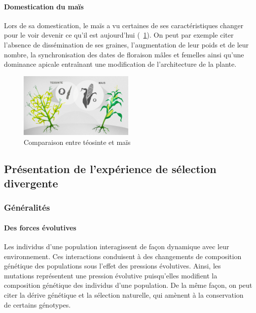 \documentclass[12pt,a4paper]{article}
\begin{document}
						\paragraph{Domestication du maïs} 
							Lors de sa domestication, le maïs a vu certaines de ses caractéristiques changer pour le voir devenir ce qu'il est aujourd'hui (~\ref{Comparaison entre téosinte et maïs}). On peut par exemple citer l'absence de dissémination de ses graines, l'augmentation de leur poids et de leur nombre, la synchronisation des dates de floraison mâles et femelles ainsi qu'une dominance apicale entraînant une modification de l'architecture de la plante.
							\begin{figure}[h]
								\centering
								\includegraphics[width=0.5\textwidth]{comparaison.jpg}
								\caption{Comparaison entre téosinte et maïs}
								\label{Comparaison entre téosinte et maïs}
							\end{figure}
	
						
						
				\subsection{Présentation de l'expérience de sélection divergente}
				
					\subsubsection{Généralités}
						
						\paragraph{Des forces évolutives}
							Les individus d'une population interagissent de façon dynamique avec leur environnement. Ces interactions conduisent à des changements de composition génétique des populations sous l'effet des pressions évolutives. Ainsi, les mutations représentent une pression évolutive puisqu'elles modifient la composition génétique des individus d'une population. De la même façon, on peut citer la dérive génétique et la sélection naturelle, qui amènent à la conservation de certains génotypes.
							
\end{document}
